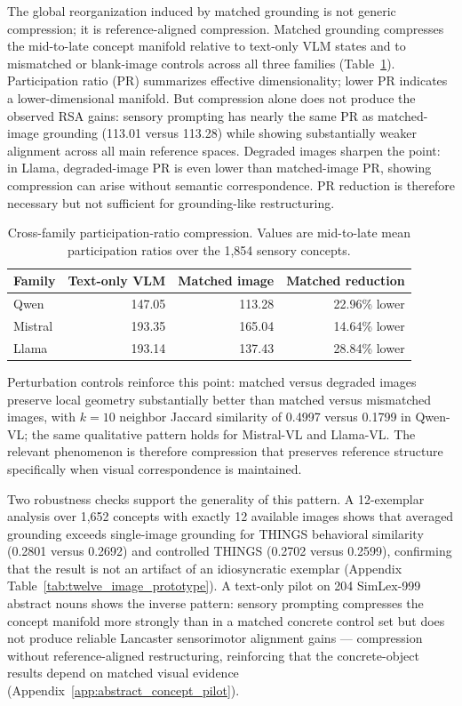 \documentclass{article}
\begin{document}
The global reorganization induced by matched grounding is not generic compression; it is reference-aligned compression. Matched grounding compresses the mid-to-late concept manifold relative to text-only VLM states and to mismatched or blank-image controls across all three families (Table~\ref{tab:cross_family_pr}). Participation ratio (PR) summarizes effective dimensionality; lower PR indicates a lower-dimensional manifold. But compression alone does not produce the observed RSA gains: sensory prompting has nearly the same PR as matched-image grounding (113.01 versus 113.28) while showing substantially weaker alignment across all main reference spaces. Degraded images sharpen the point: in Llama, degraded-image PR is even lower than matched-image PR, showing compression can arise without semantic correspondence. PR reduction is therefore necessary but not sufficient for grounding-like restructuring.

\begin{table}[!htbp]
\centering
\caption{Cross-family participation-ratio compression. Values are mid-to-late mean participation ratios over the 1,854 sensory concepts.}
\label{tab:cross_family_pr}
\small
\begin{tabular}{lrrr}
  \toprule
  Family & Text-only VLM & Matched image & Matched reduction \\
  \midrule
  Qwen & 147.05 & 113.28 & 22.96\% lower \\
  Mistral & 193.35 & 165.04 & 14.64\% lower \\
  Llama & 193.14 & 137.43 & 28.84\% lower \\
  \bottomrule
\end{tabular}
\end{table}

Perturbation controls reinforce this point: matched versus degraded images preserve local geometry substantially better than matched versus mismatched images, with \(k=10\) neighbor Jaccard similarity of 0.4997 versus 0.1799 in Qwen-VL; the same qualitative pattern holds for Mistral-VL and Llama-VL. The relevant phenomenon is therefore compression that preserves reference structure specifically when visual correspondence is maintained.

Two robustness checks support the generality of this pattern. A 12-exemplar analysis over 1,652 concepts with exactly 12 available images shows that averaged grounding exceeds single-image grounding for THINGS behavioral similarity (0.2801 versus 0.2692) and controlled THINGS (0.2702 versus 0.2599), confirming that the result is not an artifact of an idiosyncratic exemplar (Appendix Table~\ref{tab:twelve_image_prototype}). A text-only pilot on 204 SimLex-999 abstract nouns shows the inverse pattern: sensory prompting compresses the concept manifold more strongly than in a matched concrete control set but does not produce reliable Lancaster sensorimotor alignment gains --- compression without reference-aligned restructuring, reinforcing that the concrete-object results depend on matched visual evidence (Appendix~\ref{app:abstract_concept_pilot}).
\end{document}
